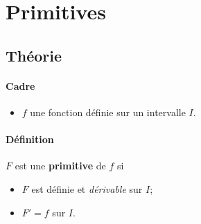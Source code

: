 \documentclass[main.tex]{subfiles}
\begin{document}
\onlyinsubfile{%
    \maketitle
    \tableofcontents
}

\chapter{Primitives}

\section{Théorie}

\begin{definition}
    [Primitive]

    \subsubsection{Cadre}
    \begin{itemize}
        \item $f$ une fonction définie sur un intervalle $I$.
    \end{itemize}

    \subsubsection{Définition}
    $F$ est une \textbf{primitive} de $f$
    si
    \begin{itemize}
        \item $F$ est définie et \emph{dérivable} sur $I$;
        \item $F' = f$ sur $I$.
    \end{itemize}
\end{definition}
\end{document}
